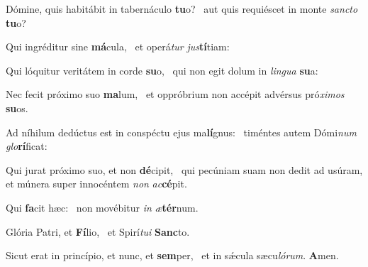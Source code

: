 \item Dómine, quis habitábit in tabernáculo \textbf{tu}o?~\psstar{} aut quis requiéscet in monte \textit{sancto} \textbf{tu}o?
\item Qui ingréditur sine \textbf{má}cula,~\psstar{} et operá\textit{tur} \textit{jus}\textbf{tí}tiam:
\item Qui lóquitur veritátem in corde \textbf{su}o,~\psstar{} qui non egit dolum in \textit{lingua} \textbf{su}a:
\item Nec fecit próximo suo \textbf{ma}lum,~\psstar{} et oppróbrium non accépit advérsus pró\textit{ximos} \textbf{su}os.
\item Ad níhilum dedúctus est in conspéctu ejus ma\textbf{lí}gnus:~\psstar{} timéntes autem Dómi\textit{num} \textit{glo}\textbf{rí}ficat:
\item Qui jurat próximo suo, et non \textbf{dé}cipit,~\psstar{} qui pecúniam suam non dedit ad usúram, et múnera super innocéntem \textit{non} \textit{ac}\textbf{cé}pit.
\item Qui \textbf{fa}cit hæc:~\psstar{} non movébitur \textit{in} \textit{æ}\textbf{tér}num.
\item Glória Patri, et \textbf{Fí}lio,~\psstar{} et Spirí\textit{tui} \textbf{Sanc}to.
\item Sicut erat in princípio, et nunc, et \textbf{sem}per,~\psstar{} et in sǽcula sæcu\textit{lórum}. \textbf{A}men.
